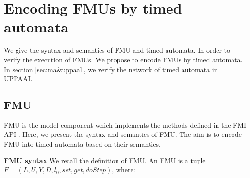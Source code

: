 \section{Encoding FMUs by timed automata}
\label{sec:fmi}
We give the syntax and semantics of FMU and timed automata. In order to verify the  execution of FMUs. We propose to encode FMUs by timed automata. In section \ref{sec:ma&uppaal}, we verify the network of timed automata in UPPAAL.
\subsection{FMU}
FMU is the model component which implements the methods defined in the FMI API \cite{Tripakis15}. Here, we present the syntax and semantics of FMU. The aim is to encode FMU into timed automata based on their semantics. 
\begin{definition}
\textbf{FMU syntax}
We recall the definition of FMU. An FMU is a tuple $F=(L,U,Y,D,l_{0},set,get,doStep)$, where:
\end{definition}
